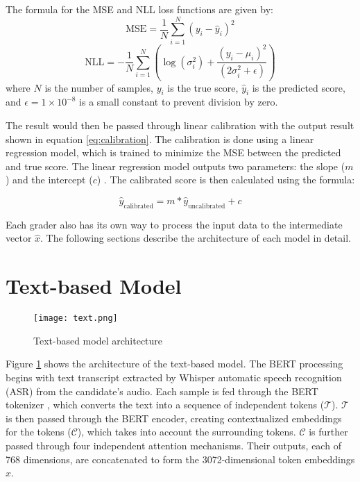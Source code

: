 The formula for the MSE and NLL loss functions are given by:
\begin{equation} \label{eq:mse}
    \text{MSE} = \frac{1}{N} \sum_{i=1}^{N} (y_i - \hat{y}_i)^2
\end{equation}
\begin{equation} \label{eq:nll}
    \text{NLL} = -\frac{1}{N} \sum_{i=1}^{N} \left( \log(\sigma_i^2) + \frac{(y_i - \mu_i)^2}{(2\sigma_i^2 + \epsilon)} \right)
\end{equation}
where $N$ is the number of samples, $y_i$ is the true score,  $\hat{y}_i$ is the predicted score, and $\epsilon = 1\times10^{-8}$ is a small constant to prevent division by zero.

The result would then be passed through linear calibration with the output result shown in equation \ref{eq:calibration}. The calibration is done using a linear regression model, which is trained to minimize the MSE between the predicted and true score. The linear regression model outputs two parameters: the slope ($m$)  and the intercept ($c$) . The calibrated score is then calculated using the formula:

\begin{equation}
    \hat{y}_{\text{calibrated}} = m*\hat{y}_{\text{uncalibrated}} + c
    \label{eq:calibration}
\end{equation}

Each grader also has its own way to process the input data to the intermediate vector $\hat{x}$. The following sections describe the architecture of each model in detail.

\section{Text-based Model}
\begin{figure}[H]
    \centering
    \texttt{[image: text.png]}
    \caption{Text-based model architecture}
    \label{fig:text}
\end{figure}

Figure \ref{fig:text} shows the architecture of the text-based model. The BERT processing begins with text transcript extracted by Whisper automatic speech recognition (ASR) from the candidate's audio. Each sample is fed through the BERT tokenizer , which converts the text into a sequence of independent tokens ($\mathcal{T}$). $\mathcal{T}$ is then passed through the BERT encoder, creating contextualized embeddings for the tokens ($\mathcal{C}$), which takes into account the surrounding tokens. $\mathcal{C}$ is further passed through four independent attention mechanisms. Their outputs, each of 768 dimensions, are concatenated to form the 3072-dimensional token embeddings $\hat{x}$.


